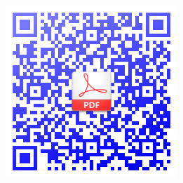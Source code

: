 \documentclass[10pt,A4]{article}
\begin{document}
\pagestyle{fancy}	


\vspace{-20.55pt}


\hspace{-0.25\linewidth}\colorbox{bgcol}{}



\begin{figure}[H]
\begin{flushright}
	\includegraphics[width=0.2\linewidth]{qrcode-ritesh-resume-main.pdf-github-pdf.png}
\end{flushright}
\end{figure}


\end{document}
